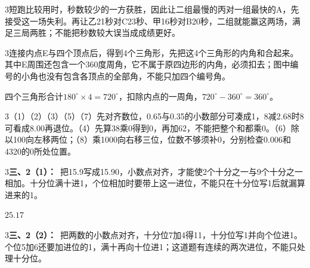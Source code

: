 \documentclass[multi=snippet,border={5bp 20bp 5bp 5bp}]{standalone}
\newenvironment{snippet}[3]{\begin{minipage}{#1bp}\color{answerred}\fontsize{#2}{#3}\selectfont\raggedright}{\end{minipage}}
\begin{document}
\begin{snippet}{505}{11.5}{14}\begin{multicols}{3}\raggedcolumns 短跑比较用时，秒数较少的一方获胜，因此让二组最慢的丙对一组最快的A，先接受这一场失利。再让乙21秒对C23秒、甲16秒对B20秒，二组就能赢这两场，满足三局两胜；不能把秒数较大误当成成绩更好。\end{multicols}\end{snippet}
\begin{snippet}{505}{11.5}{14}\begin{multicols}{3}\raggedcolumns 连接内点E与四个顶点后，得到4个三角形，先把这4个三角形的内角和合起来。其中E周围还包含一个360度周角，它不属于原四边形的内角，必须扣去；图中编号的小角也没有包含各顶点的全部角，不能只加四个编号角。\par 四个三角形合计\(180^\circ\times4=720^\circ\)\allowbreak ，扣除内点的一周角，\(720^\circ-360^\circ=360^\circ\)\allowbreak 。\end{multicols}\end{snippet}
\begin{snippet}{505}{11.5}{14}\begin{multicols}{3}\raggedcolumns （1）（2）（3）（5）（7）先对齐数位，0.65与0.35的小数部分可凑成1，8减2.68时8可看成8.00再退位。（4）先算38乘0得到0，再加62，不能把整个和都乘0。（6）除以100向左移两位；（8）乘1000向右移三位，位数不够须补0，分别检查0.006和4320的0所处位置。\end{multicols}\end{snippet}
\begin{snippet}{505}{11.5}{14}\begin{multicols}{3}\raggedcolumns \textbf{三、2（1）：}\ 把15.9写成15.90，小数点对齐，才能使2个十分之一与9个十分之一相加。十分位满十进1，个位相加时要带上这一进位，不能只在十分位写1后就漏算进来的1。\end{multicols}\end{snippet}
\begin{snippet}{32.0}{10}{14}\SourceSans\setlength{\mathindent}{2bp}\(25.17\)\end{snippet}
\begin{snippet}{505}{11.5}{14}\begin{multicols}{3}\raggedcolumns \textbf{三、2（2）：}\ 把两数的小数点对齐，十分位7加4得11，十分位写1并向个位进1。个位5加6还要加进位的1，满十再向十位进1；这道题有连续的两次进位，不能只处理十分位。\end{multicols}\end{snippet}
\end{document}
